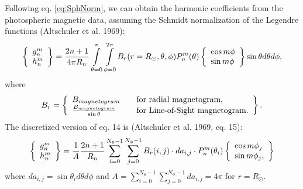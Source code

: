 Following eq. \ref{eq:SphNorm}, we can obtain the harmonic coefficients from the 
photospheric magnetic data, assuming the Schmidt normalization of the Legendre 
functions (Altschuler et al. 1969):
\begin{equation}
\label{eq:Coeff}
\left\{ \begin{array}{l l}  g_n^m\\  h_n^m\\ \end{array} \right\}=
\frac{2n+1}{4\pi R_n}\mathop{\int}_{\theta=0}^{\pi}\mathop{\int}_{\phi=0}
^{2\pi}B_r(r=R_\odot,\theta,\phi) P_n^m(\theta) 
\left\{ \begin{array}{l l}  \cos{m\phi}\\  \sin{m\phi}\\ \end{array} \right\} 
\sin{\theta} d\theta d\phi,
\end{equation}
where
\[B_r = \left\{ 
\begin{array}{l l}
B_{magnetogram} & \quad \mbox{for radial magnetogram,}\\
\frac{B_{magnetogram}}{\sin{\theta}} & \quad \mbox{for Line-of-Sight 
magnetogram.}\\
\end{array} \right\}. \]
The discretized version of eq. 14 is (Altschuler et al. 1969, eq. 15):
\begin{equation}
\label{eq:CoeffDisc}
\left\{ \begin{array}{l l}  g_n^m\\  h_n^m\\ \end{array} \right\}=
\frac{1}{A}\frac{2n+1}{R_n}\mathop{\sum}_{i=0}^{N_\theta-1} \mathop{\sum}_{j=0}
^{N_\phi-1}
B_r(i,j)\cdot da_{i,j}\cdot P_n^m(\theta_i)
\left\{ \begin{array}{l l}  \cos{m\phi_j}\\  \sin{m\phi_j},\\ \end{array} 
\right\}
\end{equation}
where $da_{i,j}=\sin{\theta}_i d\theta d\phi$ and 
$A=\mathop{\sum}_{i=0}^{N_\theta-1} \mathop{\sum}_{j=0}^{N_\phi-1}da_{i,j}=
4\pi$ for $r=R_\odot$. \\


